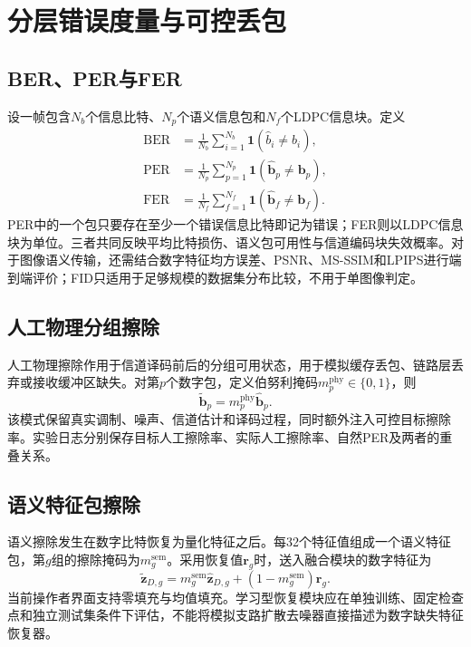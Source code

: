 \documentclass[conference]{IEEEtran}
\begin{document}
\section{分层错误度量与可控丢包}
\subsection{BER、PER与FER}
设一帧包含$N_b$个信息比特、$N_p$个语义信息包和$N_f$个LDPC信息块。定义
\begin{align}
    \mathrm{BER} &= \frac{1}{N_b}\sum_{i=1}^{N_b}\mathbf 1(\hat b_i\neq b_i), \\
    \mathrm{PER} &= \frac{1}{N_p}\sum_{p=1}^{N_p}\mathbf 1(\hat{\bm b}_p\neq\bm b_p), \\
    \mathrm{FER} &= \frac{1}{N_f}\sum_{f=1}^{N_f}\mathbf 1(\hat{\bm b}_f\neq\bm b_f).
    \label{eq:errorrates}
\end{align}
PER中的一个包只要存在至少一个错误信息比特即记为错误；FER则以LDPC信息块为单位。三者共同反映平均比特损伤、语义包可用性与信道编码块失效概率。对于图像语义传输，还需结合数字特征均方误差、PSNR、MS-SSIM和LPIPS进行端到端评价；FID只适用于足够规模的数据集分布比较，不用于单图像判定。

\subsection{人工物理分组擦除}
人工物理擦除作用于信道译码前后的分组可用状态，用于模拟缓存丢包、链路层丢弃或接收缓冲区缺失。对第$p$个数字包，定义伯努利掩码$m_p^{\mathrm{phy}}\in\{0,1\}$，则
\begin{equation}
    \tilde{\bm b}_p=m_p^{\mathrm{phy}}\hat{\bm b}_p.
    \label{eq:phy-erasure}
\end{equation}
该模式保留真实调制、噪声、信道估计和译码过程，同时额外注入可控目标擦除率。实验日志分别保存目标人工擦除率、实际人工擦除率、自然PER及两者的重叠关系。

\subsection{语义特征包擦除}
语义擦除发生在数字比特恢复为量化特征之后。每32个特征值组成一个语义特征包，第$g$组的擦除掩码为$m_g^{\mathrm{sem}}$。采用恢复值$\bm r_g$时，送入融合模块的数字特征为
\begin{equation}
    \tilde{\bm z}_{D,g}=m_g^{\mathrm{sem}}\hat{\bm z}_{D,g}
    +(1-m_g^{\mathrm{sem}})\bm r_g.
    \label{eq:semantic-erasure}
\end{equation}
当前操作者界面支持零填充与均值填充。学习型恢复模块应在单独训练、固定检查点和独立测试集条件下评估，不能将模拟支路扩散去噪器直接描述为数字缺失特征恢复器。
\end{document}
